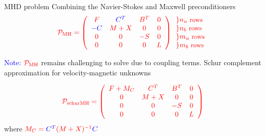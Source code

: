 \documentclass[12pt]{beamer}
\newcommand{\gr}[1]{\textcolor{darkgreen} {#1}}
\newcommand{\re}[1]{{\textcolor{red}       {#1}}}
\newcommand{\bl}[1]{{\textcolor{blue}{#1}}}
\begin{document}



\begin{frame}{MHD problem}
  Combining the Navier-Stokes and Maxwell preconditioners
  $$\re{\mathcal{P}_{\rm MH} =
  \left(
  \begin{array}{cccc}
F & \bl{C^T} & B^T & 0\\
\bl{-C} & M+X & 0 & 0 \\
0 & 0 & -S & 0\\
0 & 0 & 0 & L
  \end{array}
  \right)
  \begin{array}{l}
  \} n_u \small{\mbox{ rows}} \\ \} n_b \small{\mbox{ rows}} \\ \} m_u \small{\mbox{ rows}} \\ \} m_b \small{\mbox{ rows}}
  \end{array}
}
  $$

\vspace{2mm}

\bl{Note:} $\re{{\mathcal{P}_{\rm MH}}}$ remains challenging to solve due to coupling terms. Schur complement approximation for velocity-magnetic unknowns

$$\re{\mathcal{P}_{\rm schurMH} =
\left(
\begin{array}{cccc}
F  + M_C & C^T & B^T & 0\\
0 & M+X & 0 & 0 \\
0 & 0 & -S & 0\\
0 & 0 & 0 & L
\end{array}
\right)}$$
where $\re{M_C = \bl{C^T} (M + X)^{-1}\bl{C}}$
\end{frame}
\end{document}

